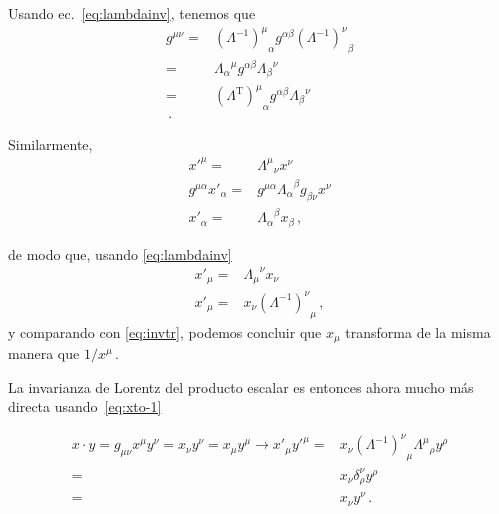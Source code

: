 \begin{frame}
Usando ec.~\eqref{eq:lambdainv}, tenemos que
\begin{align}
  \label{eq:Lambdacontra}
  g^{\mu\nu}=&{\left( \Lambda^{-1} \right)^{\mu}}_{\alpha}g^{\alpha\beta} {\left( \Lambda^{-1} \right)^{\nu}}_{\beta}\nonumber\\
=&{\Lambda_{\alpha}}^{\mu}g^{\alpha\beta}{\Lambda_{\beta}}^{\nu} \nonumber\\
=&{\left( \Lambda^{\operatorname{T}} \right)^{\mu}}_{\alpha}g^{\alpha\beta}{\Lambda_{\beta}}^{\nu} \nonumber\\\,.           
\end{align}


\end{frame}


Similarmente,
\begin{align*}
   {x'}^\mu=&{\Lambda^\mu}_{\nu}x^\nu\\
  g^{\mu\alpha}{x'}_\alpha=&g^{\mu\alpha}{\Lambda_\alpha}^{\beta}g_{\beta\nu}x^\nu\\
   {x'}_\alpha=&{\Lambda_\alpha}^{\beta}x_{\beta}\,,
\end{align*}
\begin{frame}
de modo que, usando \eqref{eq:lambdainv} 
\begin{align}
  \label{eq:xto-1}
  {x'}_\mu=&{\Lambda_\mu}^{\nu}x_{\nu}\nonumber\\
     {x'}_\mu=&x_{\nu}{\left(\Lambda^{-1}\right)^\nu}_\mu \,,
\end{align}
y comparando con \eqref{eq:invtr}, podemos concluir que $x_\mu$ transforma de la misma manera que $1/x^\mu$\,. 

  


La invarianza de Lorentz del producto escalar es entonces ahora mucho más directa usando~\eqref{eq:xto-1}

\begin{align}
  \label{eq:easyli}
  x\cdot y= g_{\mu\nu}x^{\mu}y^{\nu}=  x_\nu y^\nu = x_\mu y^\mu\to x'_\mu{y'}^\mu %
    =&x_\nu{\left(\Lambda^{-1}\right)^\nu}_\mu{\Lambda^\mu}_\rho  y^\rho \nonumber\\
    =&x_\nu \delta^\nu_\rho  y^\rho \nonumber\\
    =&x_\nu y^\nu \,.
  \end{align}

\end{frame}
  

